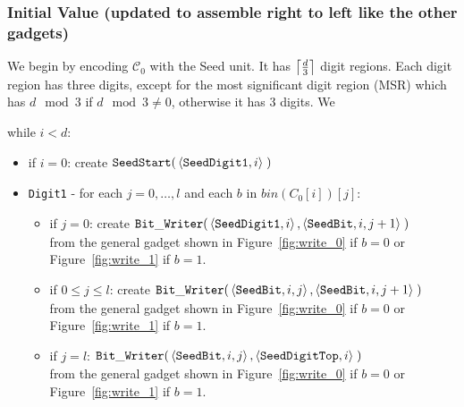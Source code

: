 \subsubsection{Initial Value (updated to assemble right to left like the other gadgets)}
We begin by encoding $\mathcal{C}_0$ with the Seed unit. It has $\ceil*{\frac{d}{3}}$ digit regions.
Each digit region has three digits, except for the most significant digit region (MSR) which has $d \mod 3$
if $d \mod 3 \not= 0$, otherwise it has 3 digits. We


while $i < d$:

\begin{itemize}
    \item if $i = 0$: create
    $\begin{aligned}[t]
        {\tt SeedStart}(&\left\langle {\tt SeedDigit1}, i \right\rangle \; )
    \end{aligned}$

    \item {\tt Digit1} - for each $j=0,\ldots,l$ and each $b$ in $bin(C_0[i])[j]$:
    \begin{itemize}
        \item if $j = 0$: create
        $\begin{aligned}[t]
            \dwriter(&\left\langle {\tt SeedDigit1}, i \right\rangle, \left\langle {\tt SeedBit}, i, j + 1 \right\rangle \;)
        \end{aligned}$\\ from the general gadget shown in Figure~\ref{fig:write_0} if $b = 0$ or Figure~\ref{fig:write_1} if $b = 1$.

        \item if $0 \leqslant j \leqslant l$: create
        $\begin{aligned}[t]
            \dwriter(&\left\langle {\tt SeedBit}, i, j \right\rangle, \left\langle {\tt SeedBit}, i, j + 1 \right\rangle \;)
        \end{aligned}$\\ from the general gadget shown in Figure~\ref{fig:write_0} if $b = 0$ or Figure~\ref{fig:write_1} if $b = 1$.

        \item if $j = l$:
        $\begin{aligned}[t]
            \dwriter(&\left\langle {\tt SeedBit}, i, j \right\rangle, \left\langle {\tt SeedDigitTop}, i \right\rangle \;)
        \end{aligned}$\\ from the general gadget shown in Figure~\ref{fig:write_0} if $b = 0$ or Figure~\ref{fig:write_1} if $b = 1$.
    \end{itemize}



\end{itemize}
